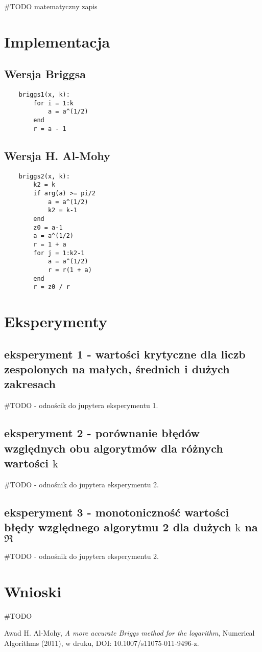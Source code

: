 \documentclass{article}
\begin{document}
	\#TODO matematyczny zapis
	
\section{Implementacja}
\subsection{Wersja Briggsa}
	\begin{lstlisting}
	briggs1(x, k):
		for i = 1:k
			a = a^(1/2)
		end
		r = a - 1
	\end{lstlisting}
\subsection{Wersja H. Al-Mohy}
	\begin{lstlisting}
	briggs2(x, k):
		k2 = k
		if arg(a) >= pi/2
			a = a^(1/2)
			k2 = k-1
		end
		z0 = a-1
		a = a^(1/2)
		r = 1 + a
		for j = 1:k2-1
			a = a^(1/2)
			r = r(1 + a)
		end
		r = z0 / r	
	\end{lstlisting}
\section{Eksperymenty}
	\subsection{eksperyment 1 - wartości krytyczne dla liczb zespolonych na małych, średnich i dużych zakresach}
	\#TODO - odnościk do jupytera eksperymentu 1.
	
	\subsection{eksperyment 2 - porównanie błędów względnych obu algorytmów dla różnych wartości $\mathrm{k}$}
	\#TODO - odnośnik do jupytera eksperymentu 2.
	
	\subsection{eksperyment 3 - monotoniczność wartości błędy względnego algorytmu 2 dla dużych $\mathrm{k}$ na $\Re$}
	\#TODO - odnośnik do jupytera eksperymentu 2.
	
\section{Wnioski}
	\#TODO
	
\begin{thebibliography}{9}
    
 Awad H. Al-Mohy,
\emph{A more accurate Briggs method for the logarithm},
Numerical Algorithms (2011), w druku,
DOI: 10.1007/s11075-011-9496-z.
    
\end{thebibliography}
\end{document}
